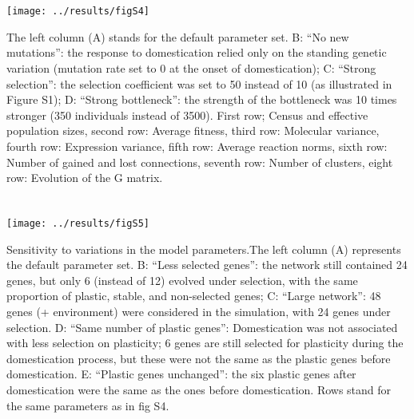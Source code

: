 \documentclass[10pt,a4paper]{article}
\begin{document}
\clearpage

\section{}

\begin{center}
\texttt{[image: ../results/figS4]}
\end{center}

The left column (A) stands for the default parameter set. B: “No new mutations”: the response to domestication relied only on the standing genetic variation (mutation rate set to 0 at the onset of domestication); C: “Strong selection”: the selection coefficient was set to 50 instead of 10 (as illustrated in Figure S1); D: “Strong bottleneck”: the strength of the bottleneck was 10 times stronger (350 individuals instead of 3500). First row; Census and effective population sizes, second row: Average fitness, third row: Molecular variance, fourth row: Expression variance, fifth row: Average reaction norms, sixth row: Number of gained and lost connections, seventh row: Number of clusters, eight row: Evolution of the G matrix. 

\clearpage

\section{}

\begin{center}
\texttt{[image: ../results/figS5]}
\end{center}

Sensitivity to variations in the model parameters.The left column (A) represents the default parameter set. B: “Less selected genes”: the network still contained 24 genes, but only 6 (instead of 12) evolved under selection, with the same proportion of plastic, stable, and non-selected genes; C: “Large network”: 48 genes (+ environment) were considered in the simulation, with 24 genes under selection. D: “Same number of plastic genes”: Domestication was not associated with less selection on plasticity; 6 genes are still selected for plasticity during the domestication process, but these were not the same as the plastic genes before domestication. E: “Plastic genes unchanged”: the six plastic genes after domestication were the same as the ones before domestication. Rows stand for the same parameters as in fig S4. 

\clearpage
\end{document}
